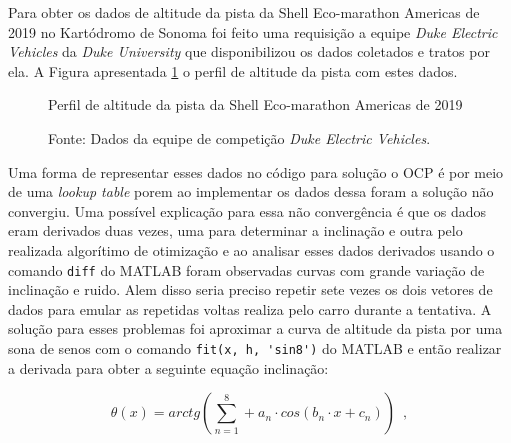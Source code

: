Para obter os dados de altitude da pista da Shell Eco-marathon Americas de 2019 no Kartódromo de Sonoma foi feito uma requisição a equipe
\textit{Duke Electric Vehicles} da \textit{Duke University} que disponibilizou os dados coletados e tratos por ela. A Figura apresentada \ref{fig:altitude_pista} 
o perfil de altitude da pista com estes dados.

\begin{figure}[h]
    \centering
    \caption{Perfil de altitude da pista da Shell Eco-marathon Americas de 2019}
    
    \label{fig:altitude_pista}
    \caption*{\footnotesize{Fonte: Dados da equipe de competição \textit{Duke Electric Vehicles}.}}
\end{figure}

Uma forma de representar esses dados no código para solução o OCP é por meio de uma \textit{lookup table} porem ao implementar os dados dessa foram
a solução não convergiu. Uma possível explicação para essa não convergência é que os dados eram derivados duas vezes, uma para determinar a inclinação e outra pelo 
realizada algorítimo de otimização e ao analisar esses dados derivados usando o comando \lstinline[style=Matlab-editor]{diff} do MATLAB  foram observadas curvas
com grande variação de inclinação e ruido. Alem disso seria preciso repetir sete vezes os dois vetores de dados para emular as repetidas voltas realiza pelo carro durante a tentativa.
A solução para esses problemas foi aproximar a curva de altitude da pista por uma sona de senos com o comando \lstinline[style=Matlab-editor]{fit(x, h, 'sin8')} do MATLAB  
e então realizar a derivada para obter a seguinte equação inclinação:

\begin{equation}
	\label{eq:modeloTheta}
	\theta(x) = arctg \left( \sum_{n = 1}^{8} + a_n \cdot cos(b_n \cdot x + c_n) \right)
	\enspace,
\end{equation}

